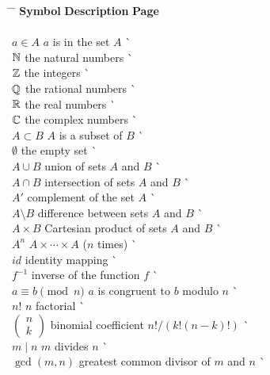 \begin{tabbing}
\hspace{1.5in} \= \hspace{2.5in} \= \kill
{\bf Symbol}  \> {\bf Description} \>  \` {\bf Page} \\ 
     \mbox{\hspace*{1in}} \\
$a \in A$ \> $a$ is in the set $A$ \> \` \pageref{setmembership} \\
${\Bbb N}$ \> the natural numbers \> \` \pageref{naturalnum} \\
${\Bbb Z}$ \> the integers \> \` \pageref{integers} \\
${\Bbb Q}$ \> the rational numbers \> \` \pageref{rationals} \\
${\Bbb R}$ \> the real numbers \> \` \pageref{reals} \\
${\Bbb C}$ \> the complex numbers \> \` \pageref{complexnum} \\
$A \subset B$ \> $A$ is a subset of $B$ \> \` \pageref{setcontain} \\
$\emptyset$ \> the empty set \> \` \pageref{theemptyset} \\
$A \cup B$ \> union of sets $A$ and $B$ \> \` \pageref{union} \\
$A \cap B$ \> intersection of sets $A$ and $B$ \> 
     \` \pageref{intersection} \\
$A'$ \> complement of the  set $A$	 \> \` \pageref{setcomplement} \\
$A \setminus B$ \> difference between sets $A$ and $B$ \>
     \` \pageref{setdifference} \\
$A \times B$ \> Cartesian product of sets $A$ and $B$ \>
     \` \pageref{cartesian} \\
$A^n$ \> $A \times \cdots \times A$ ($n$ times) \> 
     \` \pageref{ncartesian} \\
$id$ \> identity mapping \> \` \pageref{noteidentity} \\
$f^{-1}$ \> inverse of the function $f$	\> \` \pageref{inversefunc} \\
$a \equiv b \pmod{n}$ \> $a$ is congruent to $b$ modulo $n$ \> 
     \` \pageref{amodb} \\
$n!$ \> $n$ factorial \> \` \pageref{factorial} \\
$\left(\begin{array}{c}n \\ k \end{array} \right)$ \> binomial
     coefficient $n!/(k! (n-k)!)$ \> \` \pageref{binomial} \\
$m \mid n$ \> $m$ divides $n$ \> \` \pageref{divides} \\
$\gcd(m, n)$ \> greatest common divisor of $m$ and $n$ \>
     \` \pageref{greatestcd}
\end{tabbing} \clearpage
